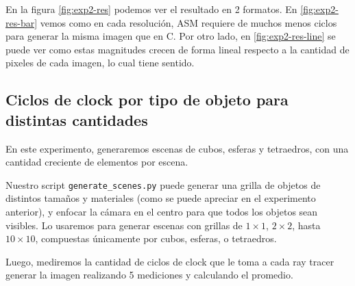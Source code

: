En la figura \ref{fig:exp2-res} podemos ver el resultado en 2 formatos. En
\ref{fig:exp2-res-bar} vemos como en cada resolución, ASM requiere de muchos
menos ciclos para generar la misma imagen que en C. Por otro lado, en
\ref{fig:exp2-res-line} se puede ver como estas magnitudes crecen de forma
lineal respecto a la cantidad de pixeles de cada imagen, lo cual tiene sentido.

\subsection{Ciclos de clock por tipo de objeto para distintas cantidades}

En este experimento, generaremos escenas de cubos, esferas y tetraedros, con una
cantidad creciente de elementos por escena.

Nuestro script \texttt{generate\_scenes.py} puede generar una grilla de objetos
de distintos tamaños y materiales (como se puede apreciar en el experimento
anterior), y enfocar la cámara en el centro para que todos los objetos sean
visibles. Lo usaremos para generar escenas con grillas de $1 \times 1$, $2
\times 2$, hasta $10 \times 10$, compuestas únicamente por cubos, esferas, o
tetraedros.

Luego, mediremos la cantidad de ciclos de clock que le toma a cada ray tracer
generar la imagen realizando 5 mediciones y calculando el promedio.

